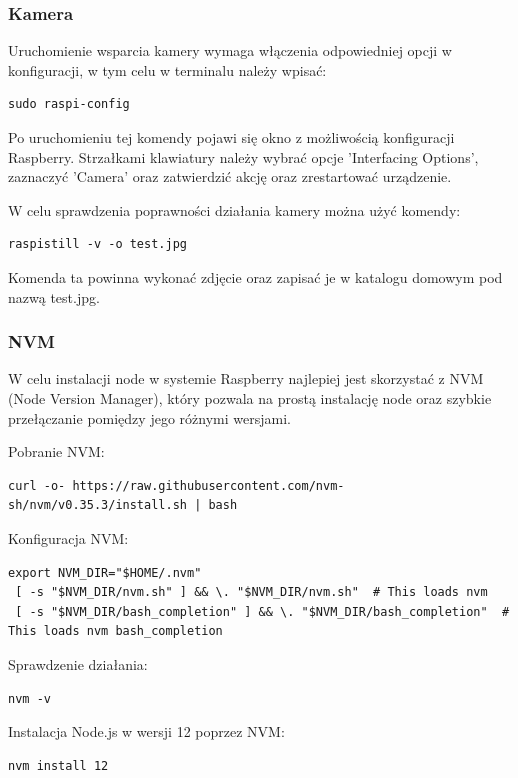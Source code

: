 \subsubsection{Kamera}

Uruchomienie wsparcia kamery wymaga włączenia odpowiedniej opcji w konfiguracji, w tym celu w terminalu należy wpisać:

\begin{lstlisting}
sudo raspi-config
\end{lstlisting}

Po uruchomieniu tej komendy pojawi się okno z możliwością konfiguracji Raspberry. Strzałkami klawiatury należy wybrać opcje 'Interfacing Options',  zaznaczyć 'Camera' oraz zatwierdzić akcję oraz zrestartować urządzenie.

W celu sprawdzenia poprawności działania kamery można użyć komendy:

\begin{lstlisting}
raspistill -v -o test.jpg
\end{lstlisting}

Komenda ta powinna wykonać zdjęcie oraz zapisać je w katalogu domowym pod nazwą test.jpg.

\subsubsection{NVM}

W celu instalacji node w systemie Raspberry najlepiej jest skorzystać z NVM (Node Version Manager), który pozwala na prostą instalację node oraz szybkie przełączanie pomiędzy jego różnymi wersjami.

Pobranie NVM:
\begin{lstlisting}[breaklines=true]
curl -o- https://raw.githubusercontent.com/nvm-sh/nvm/v0.35.3/install.sh | bash
\end{lstlisting}

Konfiguracja NVM:
\begin{lstlisting}[breaklines=true]
export NVM_DIR="$HOME/.nvm"
 [ -s "$NVM_DIR/nvm.sh" ] && \. "$NVM_DIR/nvm.sh"  # This loads nvm
 [ -s "$NVM_DIR/bash_completion" ] && \. "$NVM_DIR/bash_completion"  # This loads nvm bash_completion
\end{lstlisting}

Sprawdzenie działania:
\begin{lstlisting}
nvm -v
\end{lstlisting}

Instalacja Node.js w wersji 12 poprzez NVM:
\begin{lstlisting}
nvm install 12
\end{lstlisting}

